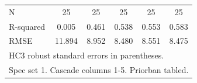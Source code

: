 \begin{table}[htbp]
\begin{tabular}{l*{5}{c}}
\midrule
N           &          25   &          25   &          25   &          25   &          25   \\
R-squared   &       0.005   &       0.461   &       0.538   &       0.553   &       0.583   \\
RMSE        &      11.894   &       8.952   &       8.480   &       8.551   &       8.475   \\
\bottomrule
\multicolumn{6}{l}{\footnotesize HC3 robust standard errors in parentheses.}\\
\multicolumn{6}{l}{\footnotesize Spec set 1. Cascade columns 1-5. Priorban tabled.}\\
\end{tabular}
\end{table}
